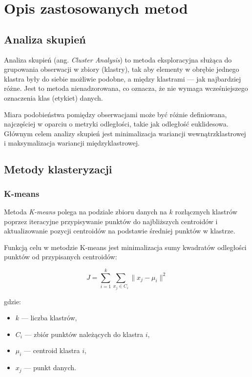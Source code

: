 \documentclass[a4paper,12pt,titlepage]{article}
\begin{document}
\section{Opis zastosowanych metod}

\subsection{Analiza skupień}

Analiza skupień (ang. \textit{Cluster Analysis}) to metoda eksploracyjna służąca do grupowania obserwacji w zbiory (klastry), tak aby elementy w obrębie jednego klastra były do siebie możliwie podobne, a między klastrami — jak najbardziej różne. Jest to metoda nienadzorowana, co oznacza, że nie wymaga wcześniejszego oznaczenia klas (etykiet) danych.

Miara podobieństwa pomiędzy obserwacjami może być różnie definiowana, najczęściej w oparciu o metryki odległości, takie jak odległość euklidesowa. Głównym celem analizy skupień jest minimalizacja wariancji wewnątrzklastrowej i maksymalizacja wariancji międzyklastrowej.

\subsection{Metody klasteryzacji}

\subsubsection{K-means}

Metoda \textit{K-means} polega na podziale zbioru danych na \( k \) rozłącznych klastrów poprzez iteracyjne przypisywanie punktów do najbliższych centroidów i aktualizowanie pozycji centroidów na podstawie średniej punktów w klastrze.

Funkcją celu w metodzie K-means jest minimalizacja sumy kwadratów odległości punktów od przypisanych centroidów:

\[
J = \sum_{i=1}^{k} \sum_{x_j \in C_i} \| x_j - \mu_i \|^2
\]

gdzie:
\begin{itemize}
    \item \( k \) — liczba klastrów,
    \item \( C_i \) — zbiór punktów należących do klastra \( i \),
    \item \( \mu_i \) — centroid klastra \( i \),
    \item \( x_j \) — punkt danych.
\end{itemize}
\end{document}
